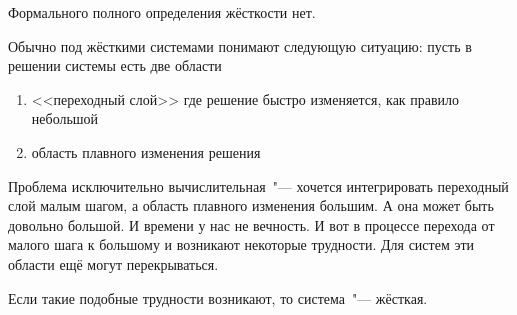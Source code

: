 \documentclass{trlnotes}
\begin{document}


\begin{defn}\label{def:ode::stiff}
  Формального полного определения жёсткости нет.  
\end{defn}
\begin{rem}
  Обычно под жёсткими системами понимают следующую ситуацию:
  пусть в решении системы есть две области
  \begin{enumerate}
    \item <<переходный слой>> где решение быстро изменяется, как правило небольшой
    \item область плавного изменения решения
  \end{enumerate}
  Проблема исключительно вычислительная~"--- хочется интегрировать переходный слой малым
  шагом, а область плавного изменения большим. А она может быть довольно большой.
  И времени у нас не вечность. И вот в процессе перехода от малого шага к большому и 
  возникают некоторые трудности. Для систем эти области ещё могут перекрываться.
  
  Если такие подобные трудности возникают, то система~"--- жёсткая.
\end{rem}
\end{document}
